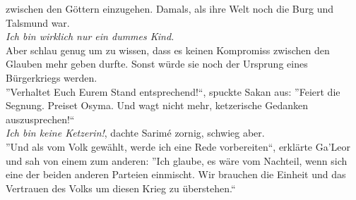 zwischen den Göttern einzugehen. Damals, als ihre Welt noch die Burg und Talsmund war.\\
\textit{Ich bin wirklich nur ein dummes Kind.}\\
Aber schlau genug um zu wissen, dass es keinen Kompromiss zwischen den Glauben mehr geben durfte. 
Sonst würde sie noch der Ursprung eines Bürgerkriegs werden.\\
''Verhaltet Euch Eurem Stand entsprechend!``, spuckte Sakan aus: ''Feiert die Segnung. Preiset 
Osyma. Und wagt nicht mehr, ketzerische Gedanken auszusprechen!``\\
\textit{Ich bin keine Ketzerin!}, dachte Sarimé zornig, schwieg aber.\\
''Und als vom Volk gewählt, werde ich eine Rede vorbereiten``, erklärte Ga'Leor und sah von einem 
zum anderen: ''Ich glaube, es wäre vom Nachteil, wenn sich eine der beiden anderen Parteien 
einmischt. Wir brauchen die Einheit und das Vertrauen des Volks um diesen Krieg zu überstehen.``\\

